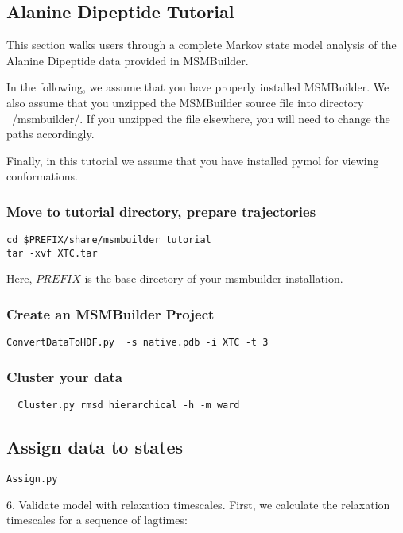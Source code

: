 \documentclass[12pt]{article}
\begin{document}
\subsection{Alanine Dipeptide Tutorial}

This section walks users through a complete Markov state model analysis of the Alanine Dipeptide data provided in MSMBuilder.

In the following, we assume that you have properly installed MSMBuilder.  We also assume that you unzipped the MSMBuilder source file into directory ~/msmbuilder/.  If you unzipped the file elsewhere, you will need to change the paths accordingly.  

Finally, in this tutorial we assume that you have installed pymol for viewing conformations.

\subsubsection{Move to tutorial directory, prepare trajectories}
\begin{verbatim}
cd $PREFIX/share/msmbuilder_tutorial 
tar -xvf XTC.tar
\end{verbatim}

Here, $PREFIX$ is the base directory of your msmbuilder installation.

\subsubsection{Create an MSMBuilder Project}
\begin{verbatim}
ConvertDataToHDF.py  -s native.pdb -i XTC -t 3
\end{verbatim}

\subsubsection{Cluster your data}
\begin{verbatim}
  Cluster.py rmsd hierarchical -h -m ward
\end{verbatim}

\subsection{Assign data to states}

\begin{verbatim}
Assign.py 
\end{verbatim}

6.   Validate model with relaxation timescales.
First, we calculate the relaxation timescales for a sequence of lagtimes:
\end{document}
